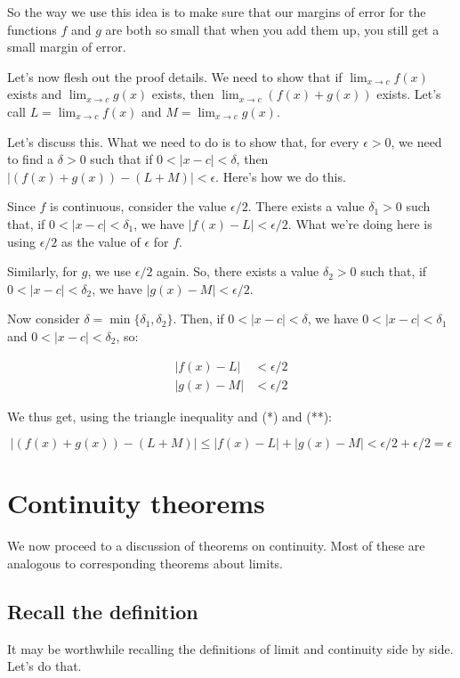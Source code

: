 \documentclass[10pt]{amsart}
\begin{document}
So the way we use this idea is to make sure that our margins of error
for the functions $f$ and $g$ are both so small that when you add them
up, you still get a small margin of error.

Let's now flesh out the proof details. We need to show that if
$\lim_{x \to c} f(x)$ exists and $\lim_{x \to c} g(x)$ exists, then
$\lim_{x \to c} (f(x) + g(x))$ exists. Let's call $L = \lim_{x \to c}
f(x)$ and $M = \lim_{x \to c} g(x)$.

Let's discuss this. What we need to do is to show that, for every
$\epsilon > 0$, we need to find a $\delta > 0$ such that if $0 < |x -
c| < \delta$, then $|(f(x) + g(x)) - (L + M)| < \epsilon$. Here's how
we do this.

Since $f$ is continuous, consider the value $\epsilon/2$. There exists
a value $\delta_1 > 0$ such that, if $0 < |x - c| < \delta_1$, we have
$|f(x) - L| < \epsilon/2$. What we're doing here is using $\epsilon/2$
as the value of $\epsilon$ for $f$.

Similarly, for $g$, we use $\epsilon/2$ again. So, there exists a
value $\delta_2> 0$ such that, if $0 < |x - c| < \delta_2$, we have
$|g(x) - M| < \epsilon/2$.

Now consider $\delta = \min \{ \delta_1, \delta_2 \}$. Then, if $0 <
|x - c| < \delta$, we have $0 < |x - c| < \delta_1$ and $0 < |x - c| <
\delta_2$, so:

\begin{align*}
  |f(x) - L| & < \epsilon/2 \tag{*}\\
  |g(x) - M| & < \epsilon/2 \tag{**}
\end{align*}

We thus get, using the triangle inequality and (*) and (**):

$$|(f(x) + g(x)) - (L + M)| \le |f(x) - L| + |g(x) - M| < \epsilon/2 + \epsilon/2 = \epsilon$$

\section{Continuity theorems}

We now proceed to a discussion of theorems on continuity. Most of
these are analogous to corresponding theorems about limits.

\subsection{Recall the definition}

It may be worthwhile recalling the definitions of limit and continuity
side by side. Let's do that.
\end{document}
